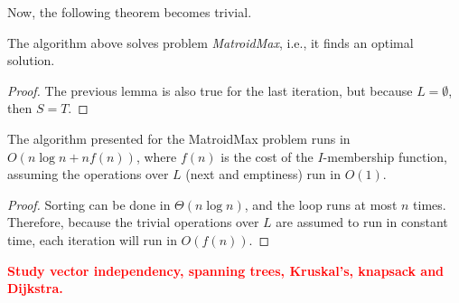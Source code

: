 Now, the following theorem becomes trivial.

\begin{theorem}
    The algorithm above solves problem \emph{MatroidMax}, i.e., it finds an optimal solution.
\end{theorem}

\begin{proof}
    The previous lemma is also true for the last iteration, but because $L = \emptyset$, then $S = T$.
\end{proof}

\begin{lemma}
    The algorithm presented for the MatroidMax problem runs in $O(n \log n + n f(n))$, where $f(n)$ is the cost of the $I$-membership function, assuming the operations over $L$ (next and emptiness) run in $O(1)$.
\end{lemma}
\begin{proof}
    Sorting can be done in $\Theta(n \log n)$, and the loop runs at most $n$ times.
    Therefore, because the trivial operations over $L$ are assumed to run in constant time, each iteration will run in $O(f(n))$.
\end{proof}

\textcolor{red}{\textbf{Study vector independency, spanning trees, Kruskal's, knapsack and Dijkstra.}}

